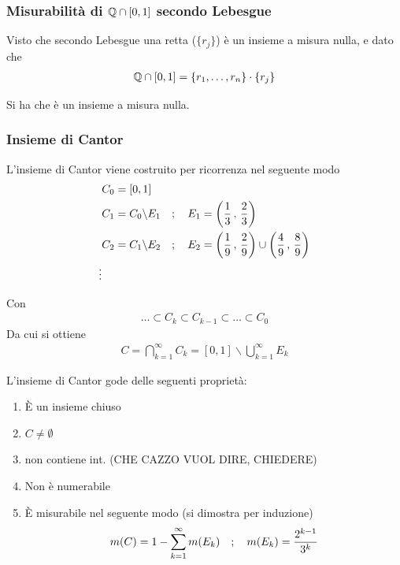 \subsubsection{Misurabilità di $\mathbb{Q}\cap [0,1]$ secondo Lebesgue}

Visto che secondo Lebesgue una retta ($ \{ r_j \}$) è un insieme a misura nulla, e dato che
\begin{align}
	\mathbb{Q} \cap [0,1] = \{ r_1, \dots, r_n \} \cdot \{ r_j \}
\end{align}

Si ha che è un insieme a misura nulla.

\subsubsection{Insieme di Cantor}

L'insieme di Cantor viene costruito per ricorrenza nel seguente modo
\begin{align}
	{}&C_0 = [0,1]\\
	&C_1 = C_0 \backslash E_1 \quad ; \quad E_1= \left( \frac{1}{3} \, , \, \frac{2}{3} \right)\\
	&C_2 = C_1 \backslash E_2 \quad ; \quad E_2 = \left( \frac{1}{9} \, , \, \frac{2}{9} \right) \cup \left( \frac{4}{9} \, , \, \frac{8}{9} \right)\\
	\vdots
\end{align}

Con
\begin{align}
	\dots \subset C_k \subset C_{k-1}\subset \dots \subset C_0
\end{align}
Da cui si ottiene
\begin{align}
	C= \bigcap_{k=1}^{\infty} C_k = [0,1] \backslash \bigcup_{k=1}^{\infty} E_k
\end{align}

L'insieme di Cantor gode delle seguenti proprietà:
\begin{enumerate}
	\item È un insieme chiuso
	\item $C \neq \emptyset$
	\item non contiene int. (CHE CAZZO VUOL DIRE, CHIEDERE)
	\item Non è numerabile
	\item È misurabile nel seguente modo (si dimostra per induzione)
	\begin{align}
		m(C)= 1 - \sum_{k=1}^{\infty} m(E_k) \quad ; \quad m(E_k)= \frac{2^{k-1}}{3^k}
	\end{align} 
\end{enumerate}

